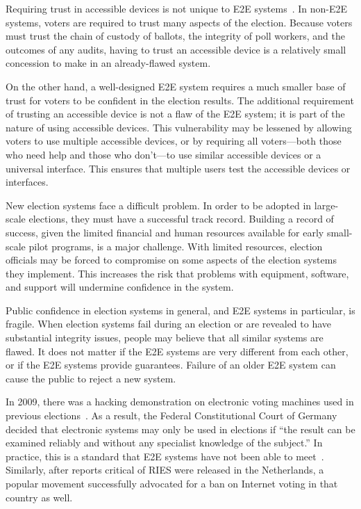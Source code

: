 Requiring trust in accessible devices is not unique to E2E
systems~\cite{runyan2007improving}. In non-E2E systems, voters are
required to trust many aspects of the election. Because voters must
trust the chain of custody of ballots, the integrity of poll workers,
and the outcomes of any audits, having to trust an accessible device
is a relatively small concession to make in an already-flawed system.

On the other hand, a well-designed E2E system requires a much smaller
base of trust for voters to be confident in the election results. The
additional requirement of trusting an accessible device is not a flaw
of the E2E system; it is part of the nature of using accessible
devices. This vulnerability may be lessened by allowing voters to use
multiple accessible devices, or by requiring all voters---both those
who need help and those who don't---to use similar accessible devices
or a universal interface. This ensures that multiple users test the
accessible devices or interfaces.


New election systems face a difficult problem. In order to be adopted
in large-scale elections, they must have a successful track
record. Building a record of success, given the limited financial and
human resources available for early small-scale pilot programs, is a
major challenge. With limited resources, election officials may be
forced to compromise on some aspects of the election systems they
implement. This increases the risk that problems with equipment,
software, and support will undermine confidence in the system.

Public confidence in election systems in general, and E2E systems in
particular, is fragile. When election systems fail during an election
or are revealed to have substantial integrity issues, people may
believe that all similar systems are flawed. It does not matter if the
E2E systems are very different from each other, or if the E2E systems
provide guarantees. Failure of an older E2E system can cause the
public to reject a new system.

In 2009, there was a hacking demonstration on electronic voting
machines used in previous elections~\cite{germany2009decision}. As a
result, the Federal Constitutional Court of Germany decided that
electronic systems may only be used in elections if ``the result can
be examined reliably and without any specialist knowledge of the
subject.'' In practice, this is a standard that E2E systems have not
been able to meet~\cite{byrne2007usability}. Similarly, after reports
critical of RIES were released in the Netherlands, a popular movement
successfully advocated for a ban on Internet voting in that country as
well.


